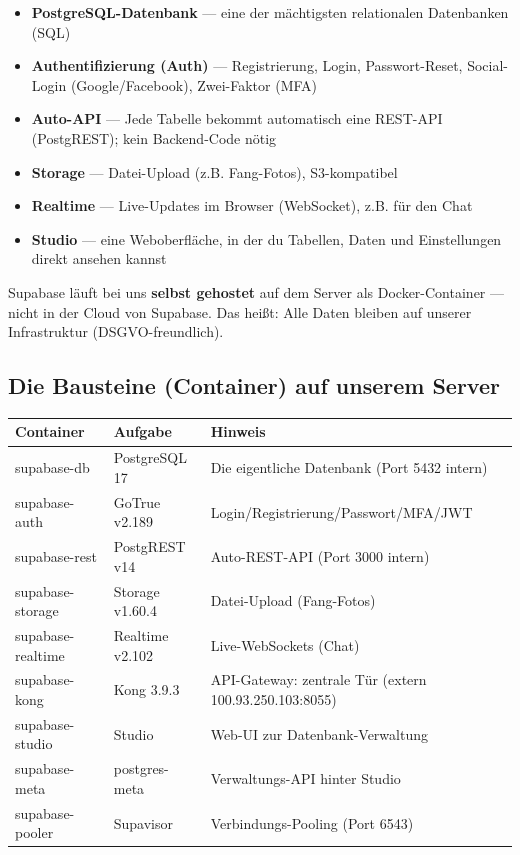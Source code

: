 \documentclass[11pt, a4paper]{article}
\begin{document}
\begin{itemize}
    \item \textbf{PostgreSQL-Datenbank} — eine der mächtigsten relationalen Datenbanken (SQL)
    \item \textbf{Authentifizierung (Auth)} — Registrierung, Login, Passwort-Reset, Social-Login (Google/Facebook), Zwei-Faktor (MFA)
    \item \textbf{Auto-API} — Jede Tabelle bekommt automatisch eine REST-API (PostgREST); kein Backend-Code nötig
    \item \textbf{Storage} — Datei-Upload (z.B. Fang-Fotos), S3-kompatibel
    \item \textbf{Realtime} — Live-Updates im Browser (WebSocket), z.B. für den Chat
    \item \textbf{Studio} — eine Weboberfläche, in der du Tabellen, Daten und Einstellungen direkt ansehen kannst
\end{itemize}

Supabase läuft bei uns \textbf{selbst gehostet} auf dem Server als Docker-Container — nicht in der Cloud von Supabase. Das heißt: Alle Daten bleiben auf unserer Infrastruktur (DSGVO-freundlich).

\subsection{Die Bausteine (Container) auf unserem Server}

\begin{tabularx}{\textwidth}{llX}
\toprule
\textbf{Container} & \textbf{Aufgabe} & \textbf{Hinweis} \\
\midrule
supabase-db & PostgreSQL 17 & Die eigentliche Datenbank (Port 5432 intern) \\
supabase-auth & GoTrue v2.189 & Login/Registrierung/Passwort/MFA/JWT \\
supabase-rest & PostgREST v14 & Auto-REST-API (Port 3000 intern) \\
supabase-storage & Storage v1.60.4 & Datei-Upload (Fang-Fotos) \\
supabase-realtime & Realtime v2.102 & Live-WebSockets (Chat) \\
supabase-kong & Kong 3.9.3 & API-Gateway: zentrale Tür (extern 100.93.250.103:8055) \\
supabase-studio & Studio & Web-UI zur Datenbank-Verwaltung \\
supabase-meta & postgres-meta & Verwaltungs-API hinter Studio \\
supabase-pooler & Supavisor & Verbindungs-Pooling (Port 6543) \\
\bottomrule
\end{tabularx}
\end{document}
